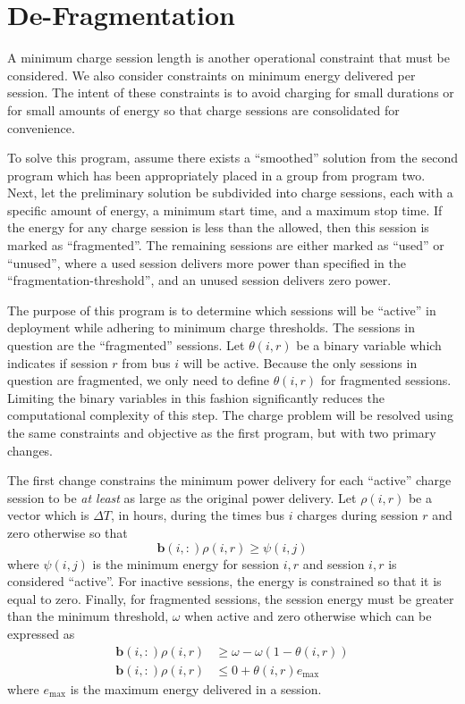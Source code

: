 \section{De-Fragmentation\label{sec:defragmentation}}
A minimum charge session length is another operational constraint that must be considered. We also consider constraints on minimum energy delivered per session. The intent of these constraints is to avoid charging for small durations or for small amounts of energy so that charge sessions are consolidated for convenience. 
\par To solve this program, assume there exists a ``smoothed'' solution from the second program which has been appropriately placed in a group from program two. Next, let the preliminary solution be subdivided into charge sessions, each with a specific amount of energy, a minimum start time, and a maximum stop time. If the energy for any charge session is less than the allowed, then this session is marked as ``fragmented''.  The remaining sessions are either marked as ``used'' or ``unused'', where a used session delivers more power than specified in the ``fragmentation-threshold'', and an unused session delivers zero power. 
\par The purpose of this program is to determine which sessions will be ``active'' in deployment while adhering to minimum charge thresholds. The sessions in question are the ``fragmented'' sessions.  Let $\theta(i,r)$ be a binary variable which indicates if session $r$ from bus $i$ will be active. Because the only sessions in question are fragmented, we only need to define $\theta(i,r)$ for fragmented sessions. Limiting the binary variables in this fashion significantly reduces the computational complexity of this step.  The charge problem will be resolved using the same constraints and objective as the first program, but with two primary changes.
\par The first change constrains the minimum power delivery for each ``active'' charge session to be {\it at least} as large as the original power delivery. Let $\rho(i,r)$ be a vector which is $\Delta T$, in hours, during the times bus $i$ charges during session $r$ and zero otherwise so that  
\begin{equation}\label{eqn:defragmentation:active}
	\mathbf{b}(i,:)\rho(i,r) \ge \psi(i,j)
\end{equation}
where $\psi(i,j)$ is the minimum energy for session $i,r$ and session $i,r$ is considered ``active''. For inactive sessions, the energy is constrained so that it is equal to zero. Finally, for fragmented sessions, the session energy must be greater than the minimum threshold, $\omega$ when active and zero otherwise which can be expressed as
\begin{equation}\begin{aligned}
	\mathbf{b}(i,:)\rho(i,r) &\ge \omega - \omega(1 - \theta(i,r)) \\
	\mathbf{b}(i,:)\rho(i,r) &\le 0 + \theta(i,r)e_{\text{max}}
\end{aligned}\end{equation}
where $e_{\text{max}}$ is the maximum energy delivered in a session. 
